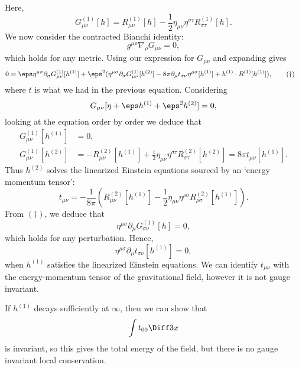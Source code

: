 \documentclass[12pt]{article}
\begin{document}
Here,
\[
	G_{\mu\nu}^{(1)}[h] = R_{\mu\nu}^{(1)}[h] - \frac 12 \eta_{\mu\nu} \eta^{\sigma\tau} R_{\sigma\tau}^{(1)}[h].
\]
We now consider the contracted Bianchi identity:
\[
g^{\mu\rho} \nabla_\rho G_{\mu\nu} = 0,
\]
which holds for any metric. Using our expression for $G_{\mu\nu}$ and expanding gives
\begin{align*}
	0 &= \eps \eta^{\mu\sigma} \partial_\sigma G_{\mu\nu}^{(1)} [h^{(1)}] + \eps^2 (\eta^{\mu\sigma} \partial_\sigma G_{\mu\nu}^{(1)}[h^{(2)}] - 8 \pi \partial_\mu t_{\sigma\nu} \eta^{\mu\sigma}[h^{(1)}] + h^{(1)} \cdot R^{(1)}[h^{(1)}]), \tag{$\dagger$}
\end{align*}
where $t$ is what we had in the previous equation. Considering
\[
	G_{\mu\nu}[\eta + \eps h^{(1)} + \eps^2 h^{(2)}] = 0,
\]
looking at the equation order by order we deduce that
\begin{align*}
	G_{\mu\nu}^{(1)}[h^{(1)}] &= 0, \\
	G_{\mu\nu}^{(1)} [h^{(2)}] &= - R_{\mu\nu}^{(2)} [h^{(1)}] + \frac 12 \eta_{\mu\nu} \eta^{\sigma\tau} R_{\sigma\tau}^{(2)} [h^{(2)}] = 8 \pi t_{\mu\nu} [h^{(1)}].
\end{align*}
Thus $h^{(2)}$ solves the linearized Einstein equations sourced by an `energy momentum tensor':
\[
	t_{\mu\nu} = - \frac{1}{8 \pi} \left(R^{(2)}_{\mu\nu}[h^{(1)}] - \frac 12 \eta_{\mu\nu} \eta^{\rho\sigma} R^{(2)}_{\rho\sigma}[h^{(1)}]\right).
\]
From $(\dagger)$, we deduce that
\[
	\eta^{\mu\sigma} \partial_\mu G_{\sigma\nu}^{(1)}[h] = 0,
\]
which holds for any perturbation. Hence,
\[
	\eta^{\mu\sigma} \partial_\mu t_{\sigma\nu} [h^{(1)}] = 0,
\]
when $h^{(1)}$ satisfies the linearized Einstein equations. We can identify $t_{\mu\nu}$ with the energy-momentum tensor of the gravitational field, however it is not gauge invariant.

If $h^{(1)}$ decays sufficiently at $\infty$, then we can show that
\[
\int t_{00} \Diff 3 x
\]
is invariant, so this gives the total energy of the field, but there is no gauge invariant local conservation.
\end{document}
